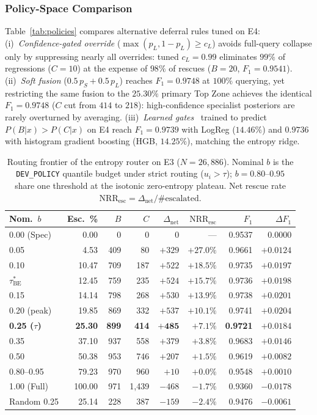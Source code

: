 \documentclass[conference,a4paper]{IEEEtran}
\begin{document}
\subsubsection{Policy-Space Comparison}
Table~\ref{tab:policies} compares alternative deferral rules tuned on E4:
(i)~\emph{Confidence-gated override} ($\max(p_L,1-p_L)\ge c_L$) avoids full-query
collapse only by suppressing nearly all overrides: tuned $c_L=0.99$ eliminates
$99\%$ of regressions ($C=10$) at the expense of $98\%$ of rescues ($B=20$,
$F_1=0.9541$).
(ii)~\emph{Soft fusion} ($0.5\,p_S+0.5\,p_L$) reaches $F_1=0.9748$ at $100\%$
querying, yet restricting the same fusion to the $25.30\%$ primary Top Zone achieves
the identical $F_1=0.9748$ ($C$ cut from $414$ to $218$): high-confidence specialist
posteriors are rarely overturned by averaging.
(iii)~\emph{Learned gates}~\cite{jitkrittum2023} trained to predict $P(B|x)>P(C|x)$
on E4 reach $F_1=0.9739$ with LogReg ($14.46\%$) and $0.9736$ with histogram gradient
boosting (HGB, $14.25\%$), matching the entropy ridge.

\begin{table}[!t]
\caption{Routing frontier of the entropy router on E3 ($N=26{,}886$). Nominal $b$ is
the {\upshape\texttt{DEV\_POLICY}} quantile budget under strict routing ($u_i>\tau$);
$b=0.80$--$0.95$ share one threshold at the isotonic zero-entropy plateau. Net
rescue rate $\text{NRR}_{\mathrm{esc}}=\Delta_{\mathrm{net}}/\#\text{escalated}$.}
\label{tab:frontier}
\centering
\scriptsize
\setlength{\tabcolsep}{2.3pt}
\begin{tabular}{lrrrrrrr}
\toprule
Nom.\ $b$ & Esc.\ \% & $B$ & $C$ & $\Delta_{\mathrm{net}}$ & $\text{NRR}_{\mathrm{esc}}$ & $F_1$ & $\Delta F_1$ \\
\midrule
0.00 (Spec) & 0.00 & 0 & 0 & 0 & --- & 0.9537 & $0.0000$ \\
0.05 & 4.53 & 409 & 80 & $+329$ & $+27.0\%$ & 0.9661 & $+0.0124$ \\
0.10 & 10.47 & 709 & 187 & $+522$ & $+18.5\%$ & 0.9735 & $+0.0197$ \\
$\tau^{\ast}_{\mathrm{BE}}$ & 12.45 & 759 & 235 & $+524$ & $+15.7\%$ & 0.9736 & $+0.0198$ \\
0.15 & 14.14 & 798 & 268 & $+530$ & $+13.9\%$ & 0.9738 & $+0.0201$ \\
0.20 (peak) & 19.85 & 869 & 332 & $+537$ & $+10.1\%$ & 0.9741 & $+0.0204$ \\
\textbf{0.25 ($\tau$)} & \textbf{25.30} & \textbf{899} & \textbf{414} & $\mathbf{+485}$ & $\mathbf{+7.1\%}$ & \textbf{0.9721} & $\mathbf{+0.0184}$ \\
0.35 & 37.10 & 937 & 558 & $+379$ & $+3.8\%$ & 0.9683 & $+0.0146$ \\
0.50 & 50.38 & 953 & 746 & $+207$ & $+1.5\%$ & 0.9619 & $+0.0082$ \\
0.80--0.95 & 79.23 & 970 & 960 & $+10$ & $+0.0\%$ & 0.9548 & $+0.0010$ \\
1.00 (Full) & 100.00 & 971 & 1{,}439 & $-468$ & $-1.7\%$ & 0.9360 & $-0.0178$ \\
\midrule
Random 0.25 & 25.14 & 228 & 387 & $-159$ & $-2.4\%$ & 0.9476 & $-0.0061$ \\
\bottomrule
\end{tabular}
\end{table}
\end{document}

